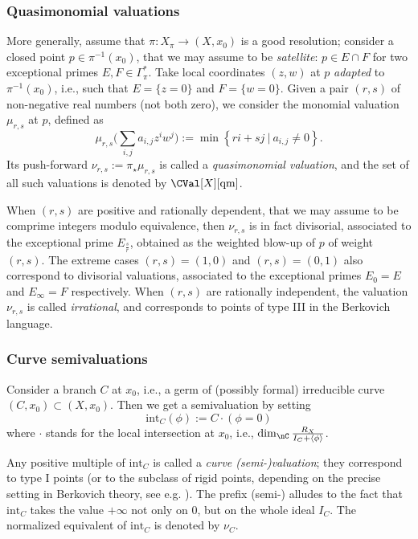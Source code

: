 \documentclass[11 pt, twoside, a4paper]{amsart}
\newcommand{\dgvert}[1]{\varGamma_{#1}^*}
\theoremstyle{definition}
\theoremstyle{definition}
\newcommand{\inte}{\mathrm{int}}
\begin{document}
\subsubsection{Quasimonomial valuations}\label{sssec:qmval}
More generally, assume that $\pi \colon X_\pi \to (X,x_0)$ is a good resolution; consider a closed point $p \in \pi^{-1}(x_0)$, that we may assume to be \emph{satellite}: $p \in E \cap F$ for two exceptional primes $E,F \in \dgvert{\pi}$.
Take local coordinates $(z,w)$ at $p$ \emph{adapted} to $\pi^{-1}(x_0)$, i.e., such that $E=\{z=0\}$ and $F=\{w=0\}$.
Given a pair $(r,s)$ of non-negative real numbers (not both zero), we consider the monomial valuation $\mu_{r,s}$ at $p$, defined as
\[
\mu_{r,s}\Big(\sum_{i,j}a_{i,j} z^i w^j \Big) := \min\left\{ri+sj\ |\ a_{i,j} \neq 0\right\}\text{.}
\]
Its push-forward $\nu_{r,s}:=\pi_\star \mu_{r,s}$ is called a \emph{quasimonomial valuation}, and the set of all such valuations is denoted by $\CVal[X][\mathrm{qm}]$.

When $(r,s)$ are positive and rationally dependent, that we may assume to be comprime integers modulo equivalence, then $\nu_{r,s}$ is in fact divisorial, associated to the exceptional prime $E_{\frac{s}{r}}$, obtained as the weighted blow-up of $p$ of weight $(r,s)$.
The extreme cases $(r,s)=(1,0)$ and $(r,s)=(0,1)$ also correspond to divisorial valuations, associated to the exceptional primes $E_0=E$ and $E_\infty = F$ respectively.
When $(r,s)$ are rationally independent, the valuation $\nu_{r,s}$ is called \emph{irrational}, and corresponds to points of type III in the Berkovich language. 

\subsubsection{Curve semivaluations}

Consider a branch $C$ at $x_0$, i.e., a germ of (possibly formal) irreducible curve $(C,x_0) \subset (X,x_0)$.
Then we get a semivaluation by setting
\[
\inte_C(\phi):= C \cdot (\phi=0)
\]
where $\cdot$ stands for the local intersection at $x_0$, i.e., $\dim_\nC \frac{R_X}{I_C + \langle \phi \rangle}$.

Any positive multiple of $\inte_C$ is called a \emph{curve (semi-)valuation}; they correspond to type I points (or to the subclass of rigid points, depending on the precise setting in Berkovich theory, see e.g. \cite[Section 1]{dujardin-favre-ruggiero:polyskewprod}).
The prefix (semi-) alludes to the fact that $\inte_C$ takes the value $+\infty$ not only on $0$, but on the whole ideal $I_C$.
The normalized equivalent of $\inte_C$ is denoted by $\nu_C$.
\end{document}
